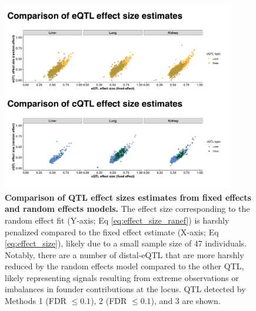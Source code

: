 \documentclass[9pt,twocolumn,twoside]{gsajnl}
\begin{document}
\begin{figure}[h]
\centering
\includegraphics[width=0.9\textwidth, trim={0in 0in 0in 0in}, clip]{figs/fixefvsranef_qtl.pdf}
\caption{\textbf{Comparison of QTL effect sizes estimates from fixed effects and random effects models.} The effect size corresponding to the random effect fit (Y-axis; Eq \ref{eq:effect_size_ranef}) is harshly penalized compared to the fixed effect estimate (X-axis; Eq \ref{eq:effect_size}), likely due to a small sample size of 47 individuals. Notably, there are a number of distal-eQTL that are more harshly reduced by the random effects model compared to the other QTL, likely representing signals resulting from extreme observations or imbalances in founder contributions at the locus. QTL detected by Methods 1 (FDR $\le 0.1$), 2 (FDR $\le 0.1$), and 3 are shown.
\label{fig:qtl_effect_size_fixefvsranef}}
\end{figure}
\end{document}
